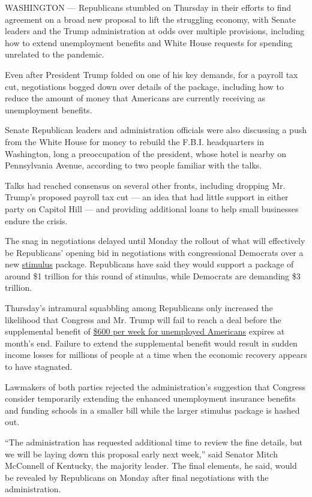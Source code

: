 WASHINGTON --- Republicans stumbled on Thursday in their efforts to find
agreement on a broad new proposal to lift the struggling economy, with
Senate leaders and the Trump administration at odds over multiple
provisions, including how to extend unemployment benefits and White
House requests for spending unrelated to the pandemic.

Even after President Trump folded on one of his key demands, for a
payroll tax cut, negotiations bogged down over details of the package,
including how to reduce the amount of money that Americans are currently
receiving as unemployment benefits.

Senate Republican leaders and administration officials were also
discussing a push from the White House for money to rebuild the F.B.I.
headquarters in Washington, long a preoccupation of the president, whose
hotel is nearby on Pennsylvania Avenue, according to two people familiar
with the talks.

Talks had reached consensus on several other fronts, including dropping
Mr. Trump's proposed payroll tax cut --- an idea that had little support
in either party on Capitol Hill --- and providing additional loans to
help small businesses endure the crisis.

The snag in negotiations delayed until Monday the rollout of what will
effectively be Republicans' opening bid in negotiations with
congressional Democrats over a new
\href{https://www.nytimes.com/interactive/2020/07/24/business/economy/600-unemployment-benefits.html}{stimulus}
package. Republicans have said they would support a package of around
\$1 trillion for this round of stimulus, while Democrats are demanding
\$3 trillion.

Thursday's intramural squabbling among Republicans only increased the
likelihood that Congress and Mr. Trump will fail to reach a deal before
the supplemental benefit of
\href{https://www.nytimes.com/2020/07/30/business/unemployment-payments-change.html}{\$600
per week for unemployed Americans} expires at month's end. Failure to
extend the supplemental benefit would result in sudden income losses for
millions of people at a time when the economic recovery appears to have
stagnated.

Lawmakers of both parties rejected the administration's suggestion that
Congress consider temporarily extending the enhanced unemployment
insurance benefits and funding schools in a smaller bill while the
larger stimulus package is hashed out.

``The administration has requested additional time to review the fine
details, but we will be laying down this proposal early next week,''
said Senator Mitch McConnell of Kentucky, the majority leader. The final
elements, he said, would be revealed by Republicans on Monday after
final negotiations with the administration.

